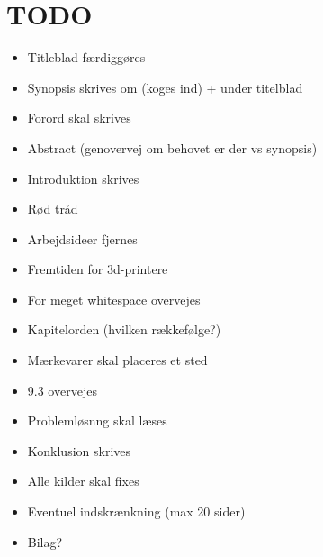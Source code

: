\chapter{TODO} %
\label{cha:todo}

\begin{itemize}
	\item Titleblad færdiggøres
	\item Synopsis skrives om (koges ind) + under titelblad
	\item Forord skal skrives
	\item Abstract (genovervej om behovet er der vs synopsis)
	\item Introduktion skrives 
	\item Rød tråd
	\item Arbejdsideer fjernes
	\item Fremtiden for 3d-printere
	\item For meget whitespace overvejes
	\item Kapitelorden (hvilken rækkefølge?)
	\item Mærkevarer skal placeres et sted
	\item 9.3 overvejes
	\item Problemløsnng skal læses
	\item Konklusion skrives
	\item Alle kilder skal fixes
	\item Eventuel indskrænkning (max 20 sider)
	\item Bilag?
\end{itemize}



